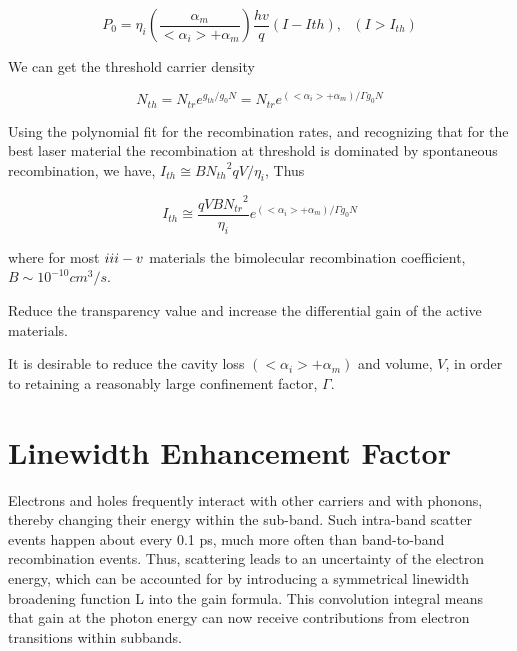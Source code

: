 \begin{equation}
  P_0 = \eta_i(\frac{\alpha_m}{<\alpha_i> + \alpha_m})\frac{hv}{q}(I - I{th}),~~~(I > I_{th})
\end{equation}


We can get the threshold carrier density

\begin{equation}
  N_{th} = N_{tr}e^{g_{th}/g_{0}N} = N_{tr}e^{(<\alpha_i> + \alpha_m)/\Gamma{g_{0}}N}
\end{equation}

Using the polynomial fit for the recombination rates, and recognizing that for
the best laser material the recombination at threshold is dominated by
spontaneous recombination, we have, $I_{th}\cong B{N_{th}}^2qV/\eta_i$, Thus

\begin{equation}
  I_{th} {\cong} \frac{qVB{N_{tr}}^2}{\eta_i}e^{(<\alpha_i> + \alpha_m)/\Gamma{g_0}N}
\end{equation}

where for most $\uppercase\expandafter{\romannumeral3} -
\uppercase\expandafter{\romannumeral5}$ materials the bimolecular recombination
coefficient, $B \sim 10^{-10} cm^3/s$.

Reduce the transparency value and increase the differential gain of the active
materials.

It is desirable to reduce the cavity loss $(<\alpha_i> + \alpha_m)$ and volume,
$V$, in order to retaining a reasonably large confinement factor, $\Gamma$.


\section{Linewidth Enhancement Factor} \label{corrections}

Electrons and holes frequently interact with other carriers and with phonons,
thereby changing their energy within the sub-band. Such intra-band scatter
events happen about every 0.1 ps, much more often than band-to-band
recombination events. Thus, scattering leads to an uncertainty of the electron
energy, which can be accounted for by introducing a symmetrical linewidth
broadening function L into the gain formula. This convolution integral means
that gain at the photon energy can now receive contributions from electron
transitions within subbands.

